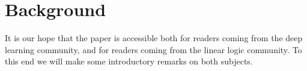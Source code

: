 \documentclass[english,letter paper,12pt,leqno]{article}
\theoremstyle{example}
\numberwithin{equation}{section}
\begin{document}





\section{Background}

It is our hope that the paper is accessible both for readers coming from the deep learning community, and for readers coming from the linear logic community. To this end we will make some introductory remarks on both subjects.
\end{document}
